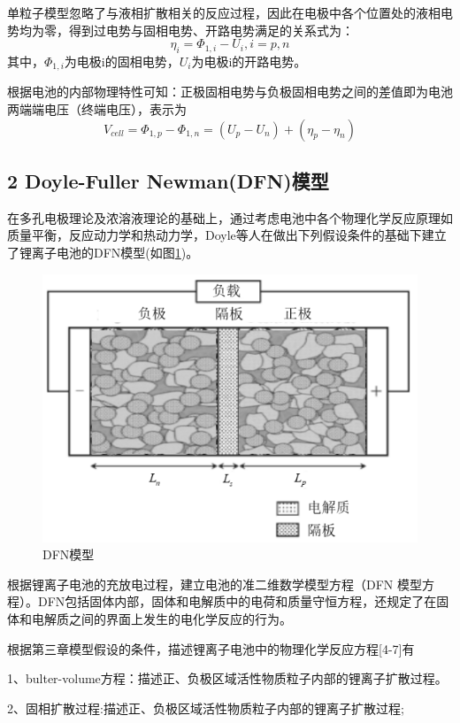 \documentclass[12pt]{ctexart}%
\begin{document}
单粒子模型忽略了与液相扩散相关的反应过程，因此在电极中各个位置处的液相电势均为零，得到过电势与固相电势、开路电势满足的关系式为：
$$\eta_{i}=\Phi_{1, i}-U_{i}, i=p, n$$
其中，$\Phi_{1, i}$为电极i的固相电势，$U_{i}$为电极i的开路电势。

根据电池的内部物理特性可知：正极固相电势与负极固相电势之间的差值即为电池两端端电压（终端电压），表示为
$$V_{c e l l}=\Phi_{1, p}-\Phi_{1, n}=\left(U_{p}-U_{n}\right)+\left(\eta_{p}-\eta_{n}\right)$$

\subsection{2 Doyle-Fuller Newman(DFN)模型}
在多孔电极理论及浓溶液理论的基础上，通过考虑电池中各个物理化学反应原理如质量平衡，反应动力学和热动力学，Doyle等人在做出下列假设条件的基础下建立了锂离子电池的DFN模型\cite{Srinivasan_2002}\cite{BOTTE20002595}(如图\ref{b})。

\begin{figure}[h]
	\centering
	\includegraphics[scale = 0.5]{2}
	\caption{DFN模型}
	\label{b}
\end{figure}

根据锂离子电池的充放电过程，建立电池的准二维数学模型方程（DFN 模型方程）。DFN包括固体内部，固体和电解质中的电荷和质量守恒方程，还规定了在固体和电解质之间的界面上发生的电化学反应的行为。

根据第三章模型假设的条件，描述锂离子电池中的物理化学反应方程[4-7]有

1、bulter-volume方程：描述正、负极区域活性物质粒子内部的锂离子扩散过程。

2、固相扩散过程:描述正、负极区域活性物质粒子内部的锂离子扩散过程;
\end{document}
